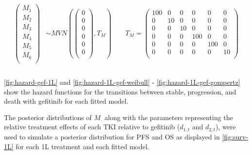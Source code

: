 \documentclass[11pt,final,fleqn]{article}\usepackage[]{graphicx}\usepackage[]{color}
\theoremstyle{plain}
\begin{document}
{\begin{equation} \label{eqn:multistate-ma-priors-gef}
\begin{aligned}
\begin{pmatrix}
M_{1}  \\
M_{2}  \\
M_{3}  \\
M_{4}  \\
M_{5}  \\
M_{6}  \\
\end{pmatrix} 
&\sim 
MVN\left(
\begin{pmatrix}
0  \\
0  \\
0  \\
0  \\
0  \\
0 \\
\end{pmatrix}, 
T_M
\right) 
\qquad
T_M =
\begin{pmatrix}
100 & 0 & 0 & 0 & 0 & 0 \\
0 & 10 & 0 & 0 & 0 & 0 \\
0 & 0 & 10 & 0 & 0 & 0 \\
0 & 0 & 0 & 100 & 0 & 0 \\
0 & 0 & 0 & 0 & 100 & 0 \\
0 & 0 & 0 & 0 & 0 & 10 \\
\end{pmatrix}\\\\
\end{aligned}
\end{equation}


\autoref{fig:hazard-gef-1L} and \autoref{fig:hazard-1L-gef-weibull} - \autoref{fig:hazard-1L-gef-gompertz} show the hazard functions for the transitions between stable, progression, and death with gefitinib for each fitted model.

The posterior distributions of $M_{\cdot}$ along with the parameters representing the relative treatment effects of each TKI relative to gefitinib ($d_{1, t}$ and ${d_{2,t}}$), were used to simulate a posterior distribution for PFS and OS as displayed in \autoref{fig:surv-1L} for each 1L treatment and each fitted model. 


}
\end{document}
